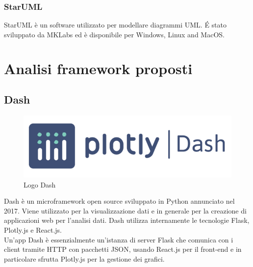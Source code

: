 \subsubsection{StarUML}
StarUML è un software utilizzato per modellare diagrammi \gls{UML}.
\'E stato sviluppato da MKLabs ed è disponibile per Windows, Linux and MacOS.



\section{Analisi framework proposti}
\label{sec:analisi-framework}
\subsection{Dash}

\begin{figure}[H]
    \centering
    \includegraphics[scale=0.4]{immagini/logo_dash.png}
   \caption{Logo Dash}
\end{figure}


Dash è un microframework open source sviluppato in Python annunciato nel 2017. Viene utilizzato per la visualizzazione dati e in generale per la creazione di applicazioni web per l'analisi dati.
Dash utilizza internamente le tecnologie Flask, Plotly.js e React.js.
\\
Un'app Dash è essenzialmente un'istanza di server Flask che comunica con i client tramite HTTP con pacchetti JSON, usando React.js per il front-end e in particolare sfrutta Plotly.js per la gestione dei grafici.

